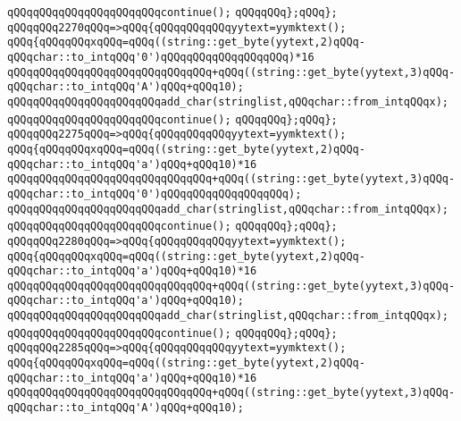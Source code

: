 \verb|qQQqqQQqqQQqqQQqqQQqqQQqcontinue();|\newline
\verb|qQQqqQQq};qQQq};|\newline
\verb|qQQqqQQq2270qQQq=>qQQq{qQQqqQQqqQQqyytext=yymktext();|\newline
\verb|qQQq{qQQqqQQqxqQQq=qQQq((string::get_byte(yytext,2)qQQq-qQQqchar::to_intqQQq'0')qQQqqQQqqQQqqQQqqQQq)*16|\newline
\verb|qQQqqQQqqQQqqQQqqQQqqQQqqQQqqQQq+qQQq((string::get_byte(yytext,3)qQQq-qQQqchar::to_intqQQq'A')qQQq+qQQq10);|\newline
\verb|qQQqqQQqqQQqqQQqqQQqqQQqadd_char(stringlist,qQQqchar::from_intqQQqx);|\newline
\verb|qQQqqQQqqQQqqQQqqQQqqQQqcontinue();|\newline
\verb|qQQqqQQq};qQQq};|\newline
\verb|qQQqqQQq2275qQQq=>qQQq{qQQqqQQqqQQqyytext=yymktext();|\newline
\verb|qQQq{qQQqqQQqxqQQq=qQQq((string::get_byte(yytext,2)qQQq-qQQqchar::to_intqQQq'a')qQQq+qQQq10)*16|\newline
\verb|qQQqqQQqqQQqqQQqqQQqqQQqqQQqqQQq+qQQq((string::get_byte(yytext,3)qQQq-qQQqchar::to_intqQQq'0')qQQqqQQqqQQqqQQqqQQq);|\newline
\verb|qQQqqQQqqQQqqQQqqQQqqQQqadd_char(stringlist,qQQqchar::from_intqQQqx);|\newline
\verb|qQQqqQQqqQQqqQQqqQQqqQQqcontinue();|\newline
\verb|qQQqqQQq};qQQq};|\newline
\verb|qQQqqQQq2280qQQq=>qQQq{qQQqqQQqqQQqyytext=yymktext();|\newline
\verb|qQQq{qQQqqQQqxqQQq=qQQq((string::get_byte(yytext,2)qQQq-qQQqchar::to_intqQQq'a')qQQq+qQQq10)*16|\newline
\verb|qQQqqQQqqQQqqQQqqQQqqQQqqQQqqQQq+qQQq((string::get_byte(yytext,3)qQQq-qQQqchar::to_intqQQq'a')qQQq+qQQq10);|\newline
\verb|qQQqqQQqqQQqqQQqqQQqqQQqadd_char(stringlist,qQQqchar::from_intqQQqx);|\newline
\verb|qQQqqQQqqQQqqQQqqQQqqQQqcontinue();|\newline
\verb|qQQqqQQq};qQQq};|\newline
\verb|qQQqqQQq2285qQQq=>qQQq{qQQqqQQqqQQqyytext=yymktext();|\newline
\verb|qQQq{qQQqqQQqxqQQq=qQQq((string::get_byte(yytext,2)qQQq-qQQqchar::to_intqQQq'a')qQQq+qQQq10)*16|\newline
\verb|qQQqqQQqqQQqqQQqqQQqqQQqqQQqqQQq+qQQq((string::get_byte(yytext,3)qQQq-qQQqchar::to_intqQQq'A')qQQq+qQQq10);|\newline
